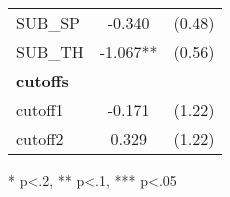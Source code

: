 \begin{table}[htb]
\begin{threeparttable}
\begin{tabular}{l c c}
      SUB\_SP                               & -0.340                 & (0.48)               \\
      SUB\_TH                               & -1.067**               & (0.56)               \\  
      \hline
      \textbf{cutoffs}                      &                        &                      \\
      cutoff1                               & -0.171                 & (1.22)               \\
      cutoff2                               & 0.329                  & (1.22)               \\
      \hline
      \hline
    \end{tabular}
    \begin{tablenotes}
    \item{* p<.2, ** p<.1, *** p<.05}
    \end{tablenotes}
  \end{threeparttable}
\end{table}

\clearpage{}

\newpage{}

